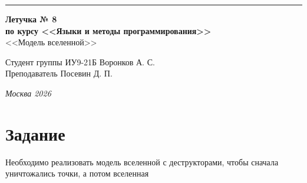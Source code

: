 \documentclass[a4paper, 14pt]{extarticle}
\begin{document}
\begin{titlepage}
\vspace*{-16pt}
\hspace{30pt}\rule{0.866\textwidth}{0.4pt}
  
\vspace{11em}

\begin{center}
\Large {\bf Летучка № 8} \\ 
\large {\bf по курсу <<Языки и методы программирования>>} \\ 
\large <<Модель вселенной>>
\end{center}\normalsize

\vspace{8em}


\begin{flushright}
  {Студент группы ИУ9-21Б Воронков А. С.\hspace*{15pt} \\
  \vspace{2ex}
  Преподаватель Посевин Д. П.\hspace*{15pt}}
\end{flushright}

\bigskip

\vfill
 

\begin{center}
\textsl{Москва 2026}
\end{center}
\end{titlepage}

\renewcommand{\ttdefault}{pcr}

\setlength{\tabcolsep}{3pt}
\newpage
\setcounter{page}{2}

\section{Задание}
Необходимо реализовать модель вселенной с деструкторами, чтобы сначала уничтожались точки, а потом вселенная

\pagebreak
\end{document}
